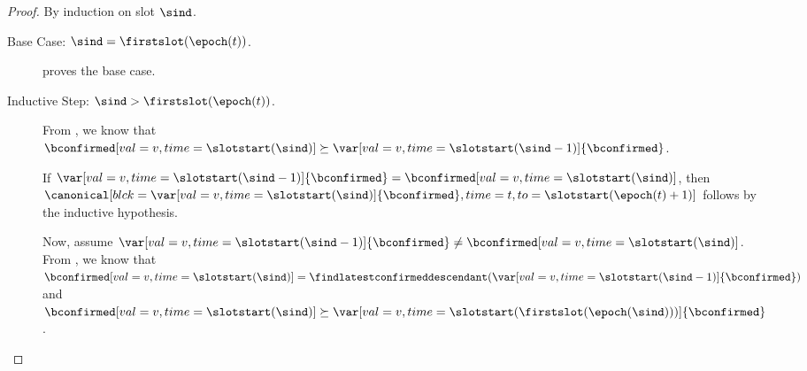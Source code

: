 \documentclass{article}
\begin{document}
\begin{proof}
    By induction on slot $\sind$.
    
    \begin{description}
        \item[Base Case: $\sind = \firstslot(\epoch(t))$.]   proves the base case.
        \item[Inductive Step: $\sind > \firstslot(\epoch(t))$.] 
        From , we know that $\bconfirmed[val=v,time=\slotstart(\sind)] \succeq \var[val=v,time=\slotstart(\sind-1)]{\bconfirmed}$.


        If $\var[val=v,time=\slotstart(\sind-1)]{\bconfirmed} = \bconfirmed[val=v,time=\slotstart(\sind)]$, then $\canonical[blck={\var[val=v,time=\slotstart(\sind)]{\bconfirmed}},time=t, to=\slotstart(\epoch(t)+1)]$ follows by the inductive hypothesis.

        Now, assume $\var[val=v,time=\slotstart(\sind-1)]{\bconfirmed} \neq \bconfirmed[val=v,time=\slotstart(\sind)]$.
        From , we know that\\ $\bconfirmed[val=v,time=\slotstart(\sind)]=\findlatestconfirmeddescendant(\var[val=v,time=\slotstart(\sind-1)]{\bconfirmed})$ and $\bconfirmed[val=v,time=\slotstart(\sind)] \succeq \var[val=v,time=\slotstart(\firstslot(\epoch(\sind)))]{\bconfirmed}$.


\end{description}
\end{proof}
\end{document}
